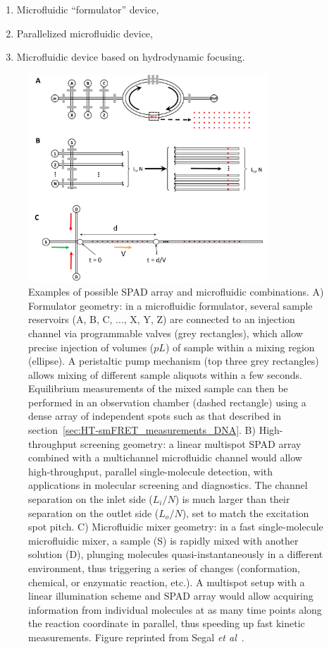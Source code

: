 \begin{enumerate}
\item Microfluidic \enquote{formulator} device,
\item Parallelized microfluidic device,
\item Microfluidic device based on hydrodynamic focusing.
\end{enumerate}

\begin{figure}
\centering\includegraphics[width=0.8\textwidth]{chapters/figures/microfluidic_examples.png}
\caption{\label{fig:microfluidic_examples} Examples of possible \ac{SPAD} array and microfluidic combinations.
A) Formulator geometry: in a microfluidic formulator, several sample reservoirs (A, B, C, ..., X, Y, Z) are connected to an injection channel via programmable valves (grey rectangles), which allow precise injection of volumes ($pL$) of sample within a mixing region (ellipse). 
A peristaltic pump mechanism (top three grey rectangles) allows mixing of different sample aliquots within a few seconds.
Equilibrium measurements of the mixed sample can then be performed in an observation chamber (dashed rectangle) using a dense array of independent spots such as that described in section~\ref{sec:HT-smFRET_measurements_DNA}.
B) High-throughput screening geometry: a linear multispot \ac{SPAD} array combined with a multichannel microfluidic channel would allow high-throughput, parallel single-molecule detection, with applications in molecular screening and diagnostics. 
The channel separation on the inlet side ($L_i/N$) is much larger than their separation on the outlet side ($L_o/N$), set to match the excitation spot pitch.
C) Microfluidic mixer geometry: in a fast single-molecule microfluidic mixer, a sample (S) is rapidly mixed with another solution (D), plunging molecules quasi-instantaneously in a different environment, thus triggering a series of changes (conformation, chemical, or enzymatic reaction, etc.). 
A multispot setup with a linear illumination scheme and \ac{SPAD} array
would allow acquiring information from individual molecules at as many time points along the reaction coordinate in parallel, thus speeding up fast kinetic measurements. 
Figure reprinted from Segal \textit{et al}~\cite{segal_methods_2019}.
}
\end{figure}

